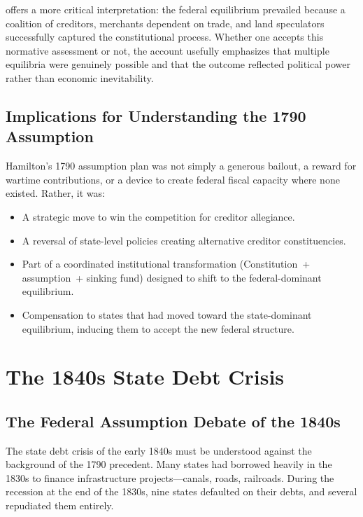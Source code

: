 \documentclass[12pt]{article}
\begin{document}
\citet[ch.~73]{Rothbard2019} offers a more critical interpretation: the
federal equilibrium prevailed because a coalition of creditors, merchants
dependent on trade, and land speculators successfully captured the
constitutional process. Whether one accepts this normative assessment or
not, the account usefully emphasizes that multiple equilibria were
genuinely possible and that the outcome reflected political power rather
than economic inevitability.

\subsection{Implications for Understanding the 1790 Assumption}

Hamilton's 1790 assumption plan was not simply a generous bailout, a
reward for wartime contributions, or a device to create federal fiscal
capacity where none existed. Rather, it was:

\begin{itemize}
\item A strategic move to win the competition for creditor allegiance.
\item A reversal of state-level policies creating alternative creditor
  constituencies.
\item Part of a coordinated institutional transformation
  (Constitution~+ assumption~+ sinking fund) designed to shift to the
  federal-dominant equilibrium.
\item Compensation to states that had moved toward the state-dominant
  equilibrium, inducing them to accept the new federal structure.
\end{itemize}


\section{The 1840s State Debt Crisis}
\label{sec:1840s}

\subsection{The Federal Assumption Debate of the 1840s}

The state debt crisis of the early 1840s must be understood against the
background of the 1790 precedent. Many states had borrowed heavily in the
1830s to finance infrastructure projects---canals, roads, railroads.
During the recession at the end of the 1830s, nine states defaulted on
their debts, and several repudiated them entirely.
\end{document}

